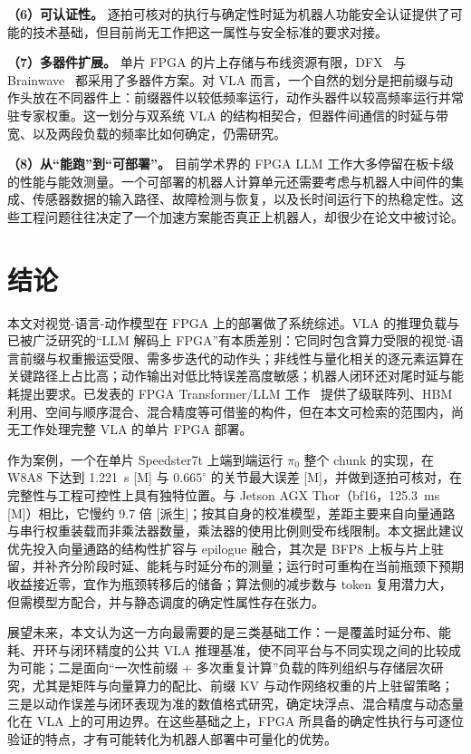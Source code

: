\documentclass[a4paper,10.5pt]{ctexart}
\newcommand{\tM}{\textsf{[M]}}              %
\newcommand{\tD}{\textsf{[派生]}}           %
\newcommand{\pizero}{$\pi_0$}
\begin{document}
\textbf{（6）可认证性。} 逐拍可核对的执行与确定性时延为机器人功能安全认证提供了可能的技术基础，但目前尚无工作把这一属性与安全标准的要求对接。

\textbf{（7）多器件扩展。} 单片 FPGA 的片上存储与布线资源有限，DFX~\cite{dfx} 与 Brainwave~\cite{brainwave} 都采用了多器件方案。对 VLA 而言，一个自然的划分是把前缀与动作头放在不同器件上：前缀器件以较低频率运行，动作头器件以较高频率运行并常驻专家权重。这一划分与双系统 VLA 的结构相契合，但器件间通信的时延与带宽、以及两段负载的频率比如何确定，仍需研究。

\textbf{（8）从“能跑”到“可部署”。} 目前学术界的 FPGA LLM 工作大多停留在板卡级的性能与能效测量。一个可部署的机器人计算单元还需要考虑与机器人中间件的集成、传感器数据的输入路径、故障检测与恢复，以及长时间运行下的热稳定性。这些工程问题往往决定了一个加速方案能否真正上机器人，却很少在论文中被讨论。
\section{结论}\label{sec:concl}

本文对视觉-语言-动作模型在 FPGA 上的部署做了系统综述。VLA 的推理负载与已被广泛研究的“LLM 解码上 FPGA”有本质差别：它同时包含算力受限的视觉-语言前缀与权重搬运受限、需多步迭代的动作头；非线性与量化相关的逐元素运算在关键路径上占比高；动作输出对低比特误差高度敏感；机器人闭环还对尾时延与能耗提出要求。已发表的 FPGA Transformer/LLM 工作~\cite{dfx,flightllm,chen2024trets,charm,ssr,edgellm} 提供了级联阵列、HBM 利用、空间与顺序混合、混合精度等可借鉴的构件，但在本文可检索的范围内，尚无工作处理完整 VLA 的单片 FPGA 部署。

作为案例，一个在单片 Speedster7t 上端到端运行 \pizero{} 整个 chunk 的实现，在 W8A8 下达到 1.221~s \tM{} 与 $0.665^\circ$ 的关节最大误差 \tM，并做到逐拍可核对，在完整性与工程可控性上具有独特位置。与 Jetson AGX Thor（bf16，125.3~ms \tM）相比，它慢约 9.7 倍 \tD；按其自身的校准模型，差距主要来自向量通路与串行权重装载而非乘法器数量，乘法器的使用比例则受布线限制。本文据此建议优先投入向量通路的结构性扩容与 epilogue 融合，其次是 BFP8 上板与片上驻留，并补齐分阶段时延、能耗与时延分布的测量；运行时可重构在当前瓶颈下预期收益接近零，宜作为瓶颈转移后的储备；算法侧的减步数与 token 复用潜力大，但需模型方配合，并与静态调度的确定性属性存在张力。

展望未来，本文认为这一方向最需要的是三类基础工作：一是覆盖时延分布、能耗、开环与闭环精度的公共 VLA 推理基准，使不同平台与不同实现之间的比较成为可能；二是面向“一次性前缀 + 多次重复计算”负载的阵列组织与存储层次研究，尤其是矩阵与向量算力的配比、前缀 KV 与动作网络权重的片上驻留策略；三是以动作误差与闭环表现为准的数值格式研究，确定块浮点、混合精度与动态量化在 VLA 上的可用边界。在这些基础之上，FPGA 所具备的确定性执行与可逐位验证的特点，才有可能转化为机器人部署中可量化的优势。
\end{document}
